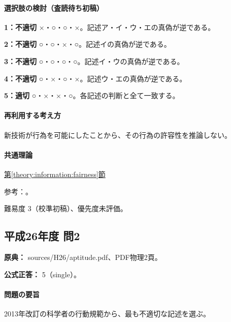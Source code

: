 \paragraph{選択肢の検討（査読待ち初稿）}\mbox{}\par

\noindent\textbf{1：不適切} ×・○・○・×。記述ア・イ・ウ・エの真偽が逆である。\par

\noindent\textbf{2：不適切} ○・○・×・○。記述イの真偽が逆である。\par

\noindent\textbf{3：不適切} ○・○・○・○。記述イ・ウの真偽が逆である。\par

\noindent\textbf{4：不適切} ○・×・○・×。記述ウ・エの真偽が逆である。\par

\noindent\textbf{5：適切} ○・×・×・○。各記述の判断と全て一致する。\par

\paragraph{再利用する考え方} 新技術が行為を可能にしたことから、その行為の許容性を推論しない。

\paragraph{共通理論} \hyperref[theory:information:fairness]{第\ref*{theory:information:fairness}節}

\par 参考：\cite{scj_code2006}。

\par 難易度 3（校準初稿）、優先度未評価。

\subsection{平成26年度 問2}
\label{q:h26-reg-apt-02}

\noindent\textbf{原典：} sources/H26/aptitude.pdf、PDF物理2頁。

\textbf{公式正答：} 5（single）。

\paragraph{問題の要旨} 2013年改訂の科学者の行動規範から、最も不適切な記述を選ぶ。

